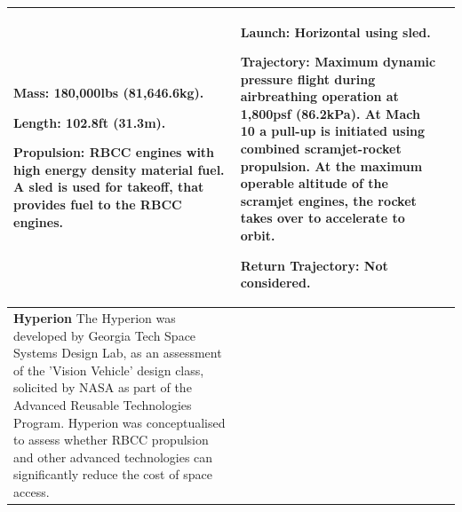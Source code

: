 {\begin{landscape}
\begin{xltabular}{\linewidth}{|X|X|X|}
			\textbf{Mass:} 180,000lbs (81,646.6kg).
			
			\textbf{Length:} 102.8ft (31.3m). 
			
			
			\textbf{Propulsion:} RBCC engines with high energy density material fuel. A sled is used for takeoff, that provides fuel to the RBCC engines. 
			
			&\small {}
			
			\textbf{Launch:} Horizontal using sled.
			
			\textbf{Trajectory:} Maximum dynamic pressure flight during airbreathing operation at 1,800psf (86.2kPa). At Mach 10 a pull-up is initiated using combined scramjet-rocket propulsion. At the maximum operable altitude of the scramjet engines, the rocket takes over to accelerate to orbit. 
			
			\textbf{Return Trajectory:} Not considered.  \\
			
			\hline \small\textbf{Hyperion}\cite{Hyperion}\newline \newline 
			The Hyperion was developed by Georgia Tech Space Systems Design Lab, as an assessment of the 'Vision Vehicle' design class, solicited by NASA as part of the Advanced Reusable Technologies Program. Hyperion was conceptualised to assess whether RBCC propulsion and other advanced technologies can significantly reduce the cost of space access. 
			&\small {}  
			

\end{xltabular}
\end{landscape}}

